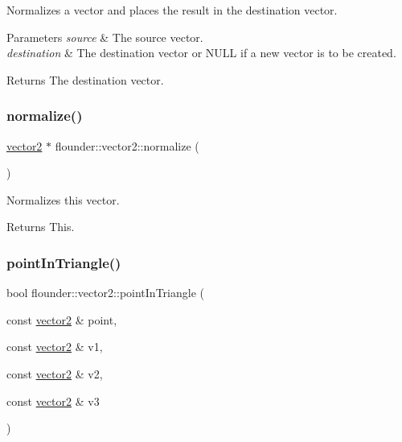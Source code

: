 Normalizes a vector and places the result in the destination vector. 


\begin{DoxyParams}{Parameters}
{\em source} & The source vector. \\
\hline
{\em destination} & The destination vector or N\+U\+LL if a new vector is to be created. \\
\hline
\end{DoxyParams}
\begin{DoxyReturn}{Returns}
The destination vector. 
\end{DoxyReturn}
\mbox{\label{classflounder_1_1vector2_a6b47b4d4a39f7a3465e03ee74299ebbe}} 
\subsubsection{\texorpdfstring{normalize()}{normalize()}\hspace{0.1cm}{\footnotesize\ttfamily [2/2]}}
{\footnotesize\ttfamily \hyperlink{classflounder_1_1vector2}{vector2} $\ast$ flounder\+::vector2\+::normalize (\begin{DoxyParamCaption}{ }\end{DoxyParamCaption})}



Normalizes this vector. 

\begin{DoxyReturn}{Returns}
This. 
\end{DoxyReturn}
\mbox{\label{classflounder_1_1vector2_a99be81b66c5723b8a163046a07f55765}} 
\subsubsection{\texorpdfstring{point\+In\+Triangle()}{pointInTriangle()}}
{\footnotesize\ttfamily bool flounder\+::vector2\+::point\+In\+Triangle (\begin{DoxyParamCaption}\item[{const \hyperlink{classflounder_1_1vector2}{vector2} \&}]{point,  }\item[{const \hyperlink{classflounder_1_1vector2}{vector2} \&}]{v1,  }\item[{const \hyperlink{classflounder_1_1vector2}{vector2} \&}]{v2,  }\item[{const \hyperlink{classflounder_1_1vector2}{vector2} \&}]{v3 }\end{DoxyParamCaption})\hspace{0.3cm}{\ttfamily [static]}}



